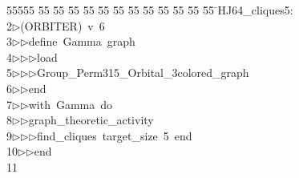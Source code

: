 %
%
\begin{tabbing}
55555 \= 55 \= 55 \= 55 \= 55 \= 55 \= 55 \= 55 \= 55 \= 55 \= 55 \= 55 \= 55 \= \>HJ64\_cliques5:\\[0pt]
2\>$\triangleright$\>(ORBITER)\ v\ 6\ \\[0pt]
3\>$\triangleright$\>$\triangleright$\>define\ Gamma\ graph\ \\[0pt]
4\>$\triangleright$\>$\triangleright$\>$\triangleright$\>load\ \\[0pt]
5\>$\triangleright$\>$\triangleright$\>$\triangleright$\>Group\_Perm315\_Orbital\_3colored\_graph\ \\[0pt]
6\>$\triangleright$\>$\triangleright$\>end\ \\[0pt]
7\>$\triangleright$\>$\triangleright$\>with\ Gamma\ do\ \\[0pt]
8\>$\triangleright$\>$\triangleright$\>graph\_theoretic\_activity\ \\[0pt]
9\>$\triangleright$\>$\triangleright$\>$\triangleright$\>find\_cliques\ target\_size\ 5\ end\ \\[0pt]
10\>$\triangleright$\>$\triangleright$\>end\\[0pt]
11\>\end{tabbing}
